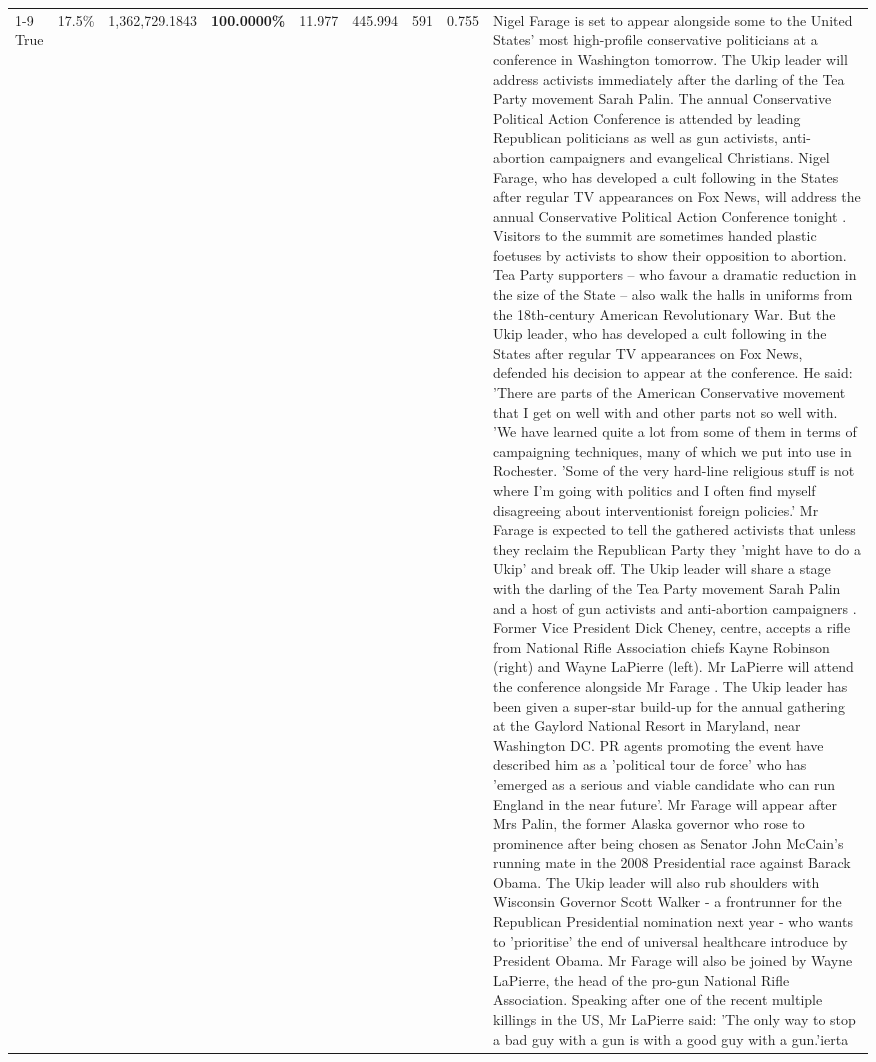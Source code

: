 \begin{table}[H]
\begin{tabular}{lllrlllll}
\cline{1-9}
True & 17.5\% & 1,362,729.1843 & \bfseries \color{red} 100.0000\% & 11.977 & 445.994 & 591 & 0.755 & Nigel Farage is set to appear alongside some to the United States' most high-profile conservative politicians at a conference in Washington tomorrow. The Ukip leader will address activists immediately after the darling of the Tea Party movement Sarah Palin. The annual Conservative Political Action Conference is attended by leading Republican politicians as well as gun activists, anti-abortion campaigners and evangelical Christians. Nigel Farage, who has developed a cult following in the States after regular TV appearances on Fox News, will address the annual Conservative Political Action Conference tonight . Visitors to the summit are sometimes handed plastic foetuses by activists to show their opposition to abortion. Tea Party supporters – who favour a dramatic reduction in the size of the State – also walk the halls in uniforms from the 18th-century American Revolutionary War. But the Ukip leader, who has developed a cult following in the States after regular TV appearances on Fox News, defended his decision to appear at the conference. He said: 'There are parts of the American Conservative movement that I get on well with and other parts not so well with. 'We have learned quite a lot from some of them in terms of campaigning techniques, many of which we put into use in Rochester. 'Some of the very hard-line religious stuff is not where I'm going with politics and I often find myself disagreeing about interventionist foreign policies.' Mr Farage is expected to tell the gathered activists that unless they reclaim the Republican Party they 'might have to do a Ukip' and break off. The Ukip leader will share a stage with the darling of the Tea Party movement Sarah Palin and a host of gun activists and anti-abortion campaigners . Former Vice President Dick Cheney, centre, accepts a rifle from National Rifle Association chiefs Kayne Robinson (right) and Wayne LaPierre (left). Mr LaPierre will attend the conference alongside Mr Farage . The Ukip leader has been given a super-star build-up for the annual gathering at the Gaylord National Resort in Maryland, near Washington DC. PR agents promoting the event have described him as a 'political tour de force' who has 'emerged as a serious and viable candidate who can run England in the near future'. Mr Farage will appear after Mrs Palin, the former Alaska governor who rose to prominence after being chosen as Senator John McCain's running mate in the 2008 Presidential race against Barack Obama. The Ukip leader will also rub shoulders with Wisconsin Governor Scott Walker - a frontrunner for the Republican Presidential nomination next year - who wants to 'prioritise' the end of universal healthcare introduce by President Obama. Mr Farage will also be joined by Wayne LaPierre, the head of the pro-gun National Rifle Association. Speaking after one of the recent multiple killings in the US, Mr LaPierre said: 'The only way to stop a bad guy with a gun is with a good guy with a gun.'ierta \\

\end{tabular}
\end{table}
